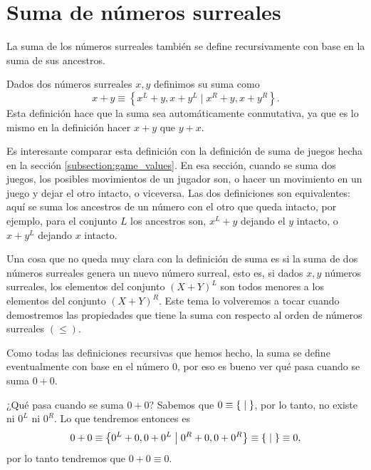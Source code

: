 \section{Suma de números surreales}

    La suma de los números surreales también se define recursivamente con base en la suma de sus ancestros.
    
    \begin{definition}
        Dados dos n\'umeros surreales $x,y$ definimos su suma como
        \[
            x + y  \equiv \left\{x^L+y, x+y^L\;|\;x^R+y, x+y^R\right\}.
        \]
        Esta definici\'on hace que la suma sea autom\'aticamente conmutativa, ya que es lo mismo en la definici\'on hacer $x+y$ que $y+x$.
    \end{definition}

    Es interesante comparar esta definici\'on con la definici\'on de suma de juegos hecha en la secci\'on \ref{subsection:game_values}. En esa secci\'on, cuando se suma dos juegos, los posibles movimientos de un jugador son, o hacer un movimiento en un juego y dejar el otro intacto, o viceversa. Las dos definiciones son equivalentes: aqu\'i se suma los ancestros de un n\'umero con el otro que queda intacto, por ejemplo, para el conjunto $L$ los ancestros son, $x^L+y$ dejando el $y$ intacto, o $x+y^L$ dejando $x$ intacto.

    Una cosa que no queda muy clara con la definici\'on de suma es si la suma de dos n\'umeros surreales genera un nuevo n\'umero surreal, esto es, si dados $x,y$ n\'umeros surreales, los elementos del conjunto $(X+Y)^L$ son todos menores a los elementos del conjunto $(X+Y)^R$. Este tema lo volveremos a tocar cuando demostremos las propiedades que tiene la suma con respecto al orden de n\'umeros surreales $(\le)$.

    Como todas las definiciones recursivas que hemos hecho, la suma se define eventualmente con base en el número $0$, por eso es bueno ver qué pasa cuando se suma $0+0$.

    \begin{example}
        ¿Qué pasa cuando se suma $0+0$? Sabemos que $0 \equiv \left\{\;\middle|\; \right\}$, por lo tanto, no existe ni $0^L$ ni $0^R$. Lo que tendremos entonces es
        \[
            0+0 \equiv \left\{0^L+0, 0+0^L\;\middle|\; 0^R+0, 0+0^R\right\} \equiv \left\{\;\middle|\; \right\} \equiv 0,
        \]
        por lo tanto tendremos que $0+0 \equiv 0$.
    \end{example}

